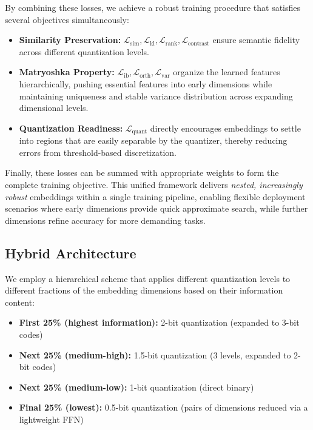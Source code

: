By combining these losses, we achieve a robust training procedure that satisfies several objectives simultaneously:
\begin{itemize}
    \item \textbf{Similarity Preservation:} $\mathcal{L}_{\text{sim}}, \mathcal{L}_{\text{kl}}, \mathcal{L}_{\text{rank}}, \mathcal{L}_{\text{contrast}}$ ensure semantic fidelity across different quantization levels.
    \item \textbf{Matryoshka Property:} $\mathcal{L}_{\text{ib}}, \mathcal{L}_{\text{orth}}, \mathcal{L}_{\text{var}}$ organize the learned features hierarchically, pushing essential features into early dimensions while maintaining uniqueness and stable variance distribution across expanding dimensional levels.
    \item \textbf{Quantization Readiness:} $\mathcal{L}_{\text{quant}}$ directly encourages embeddings to settle into regions that are easily separable by the quantizer, thereby reducing errors from threshold-based discretization.
\end{itemize}

Finally, these losses can be summed with appropriate weights to form the complete training objective.
This unified framework delivers \emph{nested, increasingly robust} embeddings within a single training pipeline, enabling flexible deployment scenarios where early dimensions provide quick approximate search, while further dimensions refine accuracy for more demanding tasks.

\subsection{Hybrid Architecture}
\label{subsec:hybrid_architecture}

We employ a hierarchical scheme that applies different quantization levels to different fractions of the embedding dimensions based on their information content:

\begin{itemize}
    \item \textbf{First 25\% (highest information):} 2-bit quantization (expanded to 3-bit codes) 
    \item \textbf{Next 25\% (medium-high):} 1.5-bit quantization (3 levels, expanded to 2-bit codes) 
    \item \textbf{Next 25\% (medium-low):} 1-bit quantization (direct binary) 
    \item \textbf{Final 25\% (lowest):} 0.5-bit quantization (pairs of dimensions reduced via a lightweight FFN)
\end{itemize}

